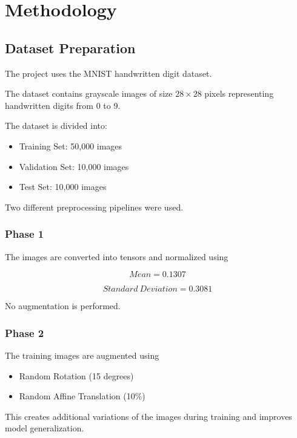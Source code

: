 \documentclass[12pt]{article}
\begin{document}

\section{Methodology}

\subsection{Dataset Preparation}

The project uses the MNIST handwritten digit dataset.

The dataset contains grayscale images of size $28\times28$ pixels representing handwritten digits from 0 to 9.

The dataset is divided into:

\begin{itemize}
    \item Training Set: 50,000 images
    \item Validation Set: 10,000 images
    \item Test Set: 10,000 images
\end{itemize}

Two different preprocessing pipelines were used.

\subsubsection{Phase 1}

The images are converted into tensors and normalized using

\[
Mean = 0.1307
\]

\[
Standard\ Deviation = 0.3081
\]

No augmentation is performed.

\subsubsection{Phase 2}

The training images are augmented using

\begin{itemize}
    \item Random Rotation (15 degrees)
    \item Random Affine Translation (10\%)
\end{itemize}

This creates additional variations of the images during training and improves model generalization.
\end{document}
